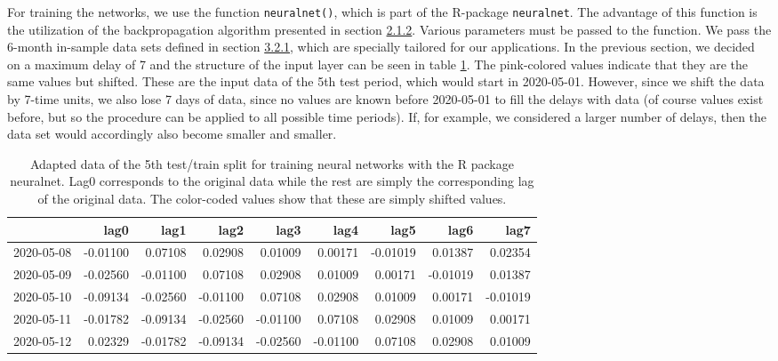 \documentclass[
]{article}
\begin{document}
For training the networks, we use the function \texttt{neuralnet()},
which is part of the R-package \texttt{neuralnet}. The advantage of this
function is the utilization of the backpropagation algorithm presented
in section \protect\hyperlink{backprogation_algorithm}{2.1.2}. Various
parameters must be passed to the function. We pass the 6-month in-sample
data sets defined in section \protect\hyperlink{test_train}{3.2.1},
which are specially tailored for our applications. In the previous
section, we decided on a maximum delay of 7 and the structure of the
input layer can be seen in table \ref{tab:data_tab}. The pink-colored
values indicate that they are the same values but shifted. These are the
input data of the 5th test period, which would start in 2020-05-01.
However, since we shift the data by 7-time units, we also lose 7 days of
data, since no values are known before 2020-05-01 to fill the delays
with data (of course values exist before, but so the procedure can be
applied to all possible time periods). If, for example, we considered a
larger number of delays, then the data set would accordingly also become
smaller and smaller.

\begin{table}[!h]

\caption{\label{tab:data_tab}Adapted data of the 5th test/train split for training neural networks with the R package neuralnet. Lag0 corresponds to the original data while the rest are simply the corresponding lag of the original data. The color-coded values show that these are simply shifted values.}
\centering
\begin{tabular}[t]{l>{}r>{}r>{}r>{}r>{}rrrr}
\toprule
  & lag0 & lag1 & lag2 & lag3 & lag4 & lag5 & lag6 & lag7\\
\midrule
2020-05-08 & \textcolor[HTML]{E413A3}{-0.01100} & \textcolor[HTML]{000000}{0.07108} & \textcolor[HTML]{000000}{0.02908} & \textcolor[HTML]{000000}{0.01009} & \textcolor[HTML]{000000}{0.00171} & -0.01019 & 0.01387 & 0.02354\\
2020-05-09 & \textcolor[HTML]{000000}{-0.02560} & \textcolor[HTML]{E413A3}{-0.01100} & \textcolor[HTML]{000000}{0.07108} & \textcolor[HTML]{000000}{0.02908} & \textcolor[HTML]{000000}{0.01009} & 0.00171 & -0.01019 & 0.01387\\
2020-05-10 & \textcolor[HTML]{000000}{-0.09134} & \textcolor[HTML]{000000}{-0.02560} & \textcolor[HTML]{E413A3}{-0.01100} & \textcolor[HTML]{000000}{0.07108} & \textcolor[HTML]{000000}{0.02908} & 0.01009 & 0.00171 & -0.01019\\
2020-05-11 & \textcolor[HTML]{000000}{-0.01782} & \textcolor[HTML]{000000}{-0.09134} & \textcolor[HTML]{000000}{-0.02560} & \textcolor[HTML]{E413A3}{-0.01100} & \textcolor[HTML]{000000}{0.07108} & 0.02908 & 0.01009 & 0.00171\\
2020-05-12 & \textcolor[HTML]{000000}{0.02329} & \textcolor[HTML]{000000}{-0.01782} & \textcolor[HTML]{000000}{-0.09134} & \textcolor[HTML]{000000}{-0.02560} & \textcolor[HTML]{E413A3}{-0.01100} & 0.07108 & 0.02908 & 0.01009\\
\bottomrule
\end{tabular}
\end{table}
\end{document}
